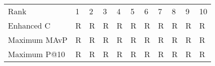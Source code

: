 \begin{tabular}{lllllllllll}
Rank & 1 & 2 & 3 & 4 & 5 & 6 & 7 & 8 & 9 & 10 \\
Enhanced C & R & R & R & R & R & R & R & R & R & R \\
Maximum MAvP & R & R & R & R & R & R & R & R & R & R \\
Maximum P@10 & R & R & R & R & R & R & R & R & R & R \\
\end{tabular}
